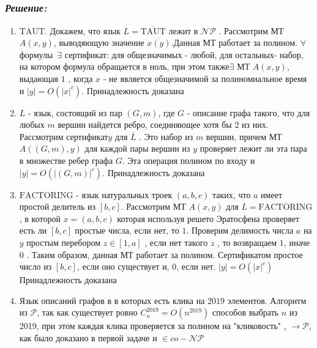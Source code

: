 \documentclass[a4paper, 11pt]{article} %
\newcommand*\circled[1]{\tikz[baseline=(char.base)]{
            \node[shape=circle,draw,inner sep=2pt] (char) {#1};}}
\begin{document}
\subsection*{\circled{3}} 
\subsubsection*{\textit{Решение:}}
\begin{enumerate}

 \item $\mathrm{TAUT}$. Докажем, что язык $L = \overline{\mathrm{TAUT}}$ лежит в $\mathcal{NP}$ . Рассмотрим МТ $A(x, y)$, выводяющую значение $\overline{x(y)}$.Данная МТ работает за полином. $\forall$ формулы $\, \exists$  сертификат: для общезначимых - любой,  для остальных- набор, на котором формула обращается в ноль, при этом также$\exists$ МТ $A(x, y)$, выдающая $1$ , когда $x$ - не является общезначимой за полиномиальное время и $|y| = O(|x|^{c})$. Принадлежность доказана
 
 \item $L$ - язык, состоящий из пар $(G, m)$, где $G$ - описание графа такого, что для любых $m$ вершин найдется ребро, соединяющее хотя бы 2 из них. Рассмотрим сертификат$y$ для $\overline{L}$ . Это набор из $m$ вершин, причем МТ $A((G, m), y)$ для каждой пары вершин из $y$ проверяет лежит ли эта пара в множестве ребер графа $G$. Эта операция полином по входу и $|y| = O(|(G, m)|^{c})$. Принадлежность доказана
 
 \item $\mathrm{FACTORING}$ - язык натуральных троек $(a, b,c)$ таких, что $a$ имеет простой делитель из $[b,c]$. Рассмотрим МТ $A(x,y)$ для $L = \overline{\mathrm{FACTORING}}$, в которой $x = (a,b,c)$ которая используя решето Эратосфена проверяет есть ли  $[b,c]$ простые числа, если
нет, то $1$. Проверим делимость числа $a$ на $y$ простым перебором $z \in [1,a]$ , если нет такого $z$ , то возвращаем $1$, иначе $0$ . Таким образом, данная МТ работает за полином. Сертификатом простое число из $[b,c]$, если оно существует и, $0$, если нет. $|y| =   O(|x|^{c})$ Принадлежность доказана

 \item Язык описаний графов в в которых есть клика на $2019$ элементов. Алгоритм из $\mathcal{P}$, так как существует ровно  $C^{2019}_n = O(n^{2019})$ способов выбрать $n$ из 2019, при этом каждая клика  проверяется за полином на "кликовость" , $\rightarrow \mathcal{P}$, как было доказано в первой задаче и  $ \in co-\mathcal{NP}$

\end{enumerate}
\end{document}
